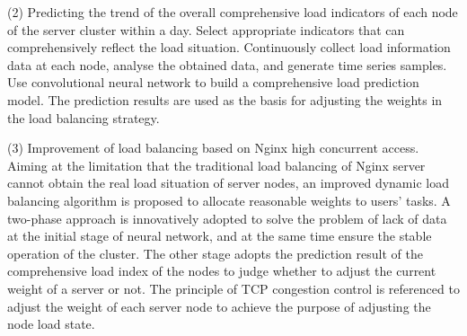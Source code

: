 \begin{eabstract}
(2) Predicting the trend of the overall comprehensive load indicators of each node of the server cluster within a day. Select appropriate indicators that can comprehensively reflect the load situation. Continuously collect load information data at each node, analyse the obtained data, and generate time series samples. Use convolutional neural network to build a comprehensive load prediction model. The prediction results are used as the basis for adjusting the weights in the load balancing strategy.
    
(3) Improvement of load balancing based on Nginx high concurrent access. Aiming at the limitation that the traditional load balancing of Nginx server cannot obtain the real load situation of server nodes, an improved dynamic load balancing algorithm is proposed to allocate reasonable weights to users' tasks. A two-phase approach is innovatively adopted to solve the problem of lack of data at the initial stage of neural network, and at the same time ensure the stable operation of the cluster. The other stage adopts the prediction result of the comprehensive load index of the nodes to judge whether to adjust the current weight of a server or not.
The principle of TCP congestion control is referenced to adjust the weight of each server node to achieve the purpose of adjusting the node load state.
\end{eabstract}

